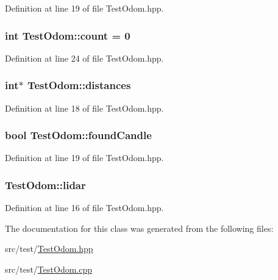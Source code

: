 Definition at line 19 of file Test\-Odom.\-hpp.

\hypertarget{classTestOdom_a336a8f23ac4a1dcc780448bc7ef7f88b}{
\subsubsection[{count}]{\setlength{\rightskip}{0pt plus 5cm}int Test\-Odom\-::count = 0\hspace{0.3cm}{\ttfamily [private]}}}\label{classTestOdom_a336a8f23ac4a1dcc780448bc7ef7f88b}


Definition at line 24 of file Test\-Odom.\-hpp.

\hypertarget{classTestOdom_a235ba0e8870aec23452d6030efaf8c7e}{
\subsubsection[{distances}]{\setlength{\rightskip}{0pt plus 5cm}int$\ast$ Test\-Odom\-::distances\hspace{0.3cm}{\ttfamily [private]}}}\label{classTestOdom_a235ba0e8870aec23452d6030efaf8c7e}


Definition at line 18 of file Test\-Odom.\-hpp.

\hypertarget{classTestOdom_ac289c026423da6aec36952f02bc39b4f}{
\subsubsection[{found\-Candle}]{\setlength{\rightskip}{0pt plus 5cm}bool Test\-Odom\-::found\-Candle\hspace{0.3cm}{\ttfamily [private]}}}\label{classTestOdom_ac289c026423da6aec36952f02bc39b4f}


Definition at line 19 of file Test\-Odom.\-hpp.

\hypertarget{classTestOdom_a4b17e0e5d2294c284a6bc4c3a496b9dd}{
\subsubsection[{lidar}]{ Test\-Odom\-::lidar\hspace{0.3cm}{\ttfamily [private]}}}\label{classTestOdom_a4b17e0e5d2294c284a6bc4c3a496b9dd}


Definition at line 16 of file Test\-Odom.\-hpp.



The documentation for this class was generated from the following files\-:\begin{DoxyCompactItemize}
\item 
src/test/\hyperlink{TestOdom_8hpp}{Test\-Odom.\-hpp}\item 
src/test/\hyperlink{TestOdom_8cpp}{Test\-Odom.\-cpp}\end{DoxyCompactItemize}
